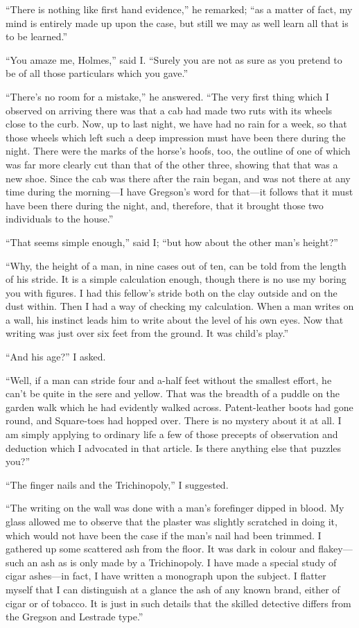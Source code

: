 \documentclass[12pt]{book}
\begin{document}
“There is nothing like first hand evidence,” he remarked; “as a matter of fact, my mind is entirely made up upon the case, but still we may as well learn all that is to be learned.” 

“You amaze me, Holmes,” said I. “Surely you are not as sure as you pretend to be of all those particulars which you gave.” 

“There’s no room for a mistake,” he answered. “The very first thing which I observed on arriving there was that a cab had made two ruts with its wheels close to the curb. Now, up to last night, we have had no rain for a week, so that those wheels which left such a deep impression must have been there during the night. There were the marks of the horse’s hoofs, too, the outline of one of which was far more clearly cut than that of the other three, showing that that was a new shoe. Since the cab was there after the rain began, and was not there at any time during the morning—I have Gregson’s word for that—it follows that it must have been there during the night, and, therefore, that it brought those two individuals to the house.” 

“That seems simple enough,” said I; “but how about the other man’s height?” 

“Why, the height of a man, in nine cases out of ten, can be told from the length of his stride. It is a simple calculation enough, though there is no use my boring you with figures. I had this fellow’s stride both on the clay outside and on the dust within. Then I had a way of checking my calculation. When a man writes on a wall, his instinct leads him to write about the level of his own eyes. Now that writing was just over six feet from the ground. It was child’s play.” 

“And his age?” I asked. 

“Well, if a man can stride four and a-half feet without the smallest effort, he can’t be quite in the sere and yellow. That was the breadth of a puddle on the garden walk which he had evidently walked across. Patent-leather boots had gone round, and Square-toes had hopped over. There is no mystery about it at all. I am simply applying to ordinary life a few of those precepts of observation and deduction which I advocated in that article. Is there anything else that puzzles you?” 

“The finger nails and the Trichinopoly,” I suggested. 

“The writing on the wall was done with a man’s forefinger dipped in blood. My glass allowed me to observe that the plaster was slightly scratched in doing it, which would not have been the case if the man’s nail had been trimmed. I gathered up some scattered ash from the floor. It was dark in colour and flakey—such an ash as is only made by a Trichinopoly. I have made a special study of cigar ashes—in fact, I have written a monograph upon the subject. I flatter myself that I can distinguish at a glance the ash of any known brand, either of cigar or of tobacco. It is just in such details that the skilled detective differs from the Gregson and Lestrade type.” 
\end{document}
